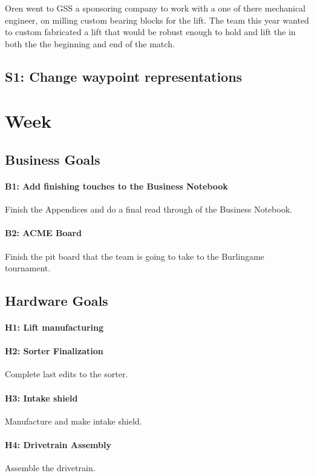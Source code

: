 \documentclass{article}
\begin{document}
Oren went to GSS a sponsoring company to work with a one of there mechanical engineer, on milling custom bearing blocks for the lift. The team this year wanted to custom fabricated a lift that would be robust enough to hold and lift the in both the the beginning and end of the match. 
\subsection{S1: Change waypoint representations}

\clearpage \newpage \section{Week \thesection} 
\subsection{Business Goals}
\paragraph{B1: Add finishing touches to the Business Notebook}
 Finish the Appendices and do a final read through of the Business Notebook.
\paragraph{B2: ACME Board}
 Finish the pit board that the team is going to take to the Burlingame tournament.
\subsection{Hardware Goals}
\paragraph{H1: Lift manufacturing}

\paragraph{H2: Sorter Finalization}
 Complete last edits to the sorter.
\paragraph{H3: Intake shield}
 Manufacture and make intake shield.
\paragraph{H4: Drivetrain Assembly}
 Assemble the drivetrain.
\end{document}

